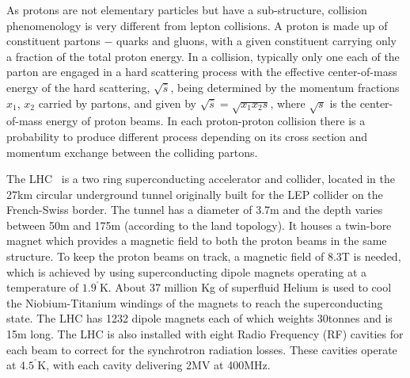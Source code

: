 As protons are not elementary particles but have a sub-structure, \pp collision phenomenology is very different from lepton collisions. A proton 
is made up of constituent partons $-$ quarks and gluons, with a given constituent carrying only a fraction of the total proton energy. In a collision, 
typically only one each of the parton are engaged in a hard scattering process with the effective center-of-mass energy of the hard scattering, 
$\sqrt{\hat{s}}$, being determined by the momentum fractions $x_{1}$, $x_{2}$ carried by partons, and given by $\sqrt{\hat{s}}=\sqrt{x_{1}x_{2}s}$, 
where $\sqrt{s}$ is the center-of-mass energy of proton beams. In each proton-proton collision there is a probability to produce different process 
depending on its cross section and momentum exchange between the colliding partons.

The LHC~\cite{Evans:2008zzb,Brüning:782076} is a two ring superconducting accelerator and collider, located in the 27\unit{km} circular underground 
tunnel originally built for the LEP collider on the French-Swiss border. The tunnel has a diameter of 3.7\unit{m} and the depth varies between 
50\unit{m} and 175\unit{m} (according to the land topology). It houses a twin-bore magnet which provides a magnetic field to both the proton beams in 
the same structure. To keep the proton beams on track, a magnetic field of 8.3\unit{T} is needed, which is achieved by using superconducting dipole 
magnets operating at a temperature of $1.9^{^{\circ}}$\unit{K}. About 37 million Kg of superfluid Helium is used to cool the Niobium-Titanium windings 
of the magnets to reach the superconducting state. The LHC has 1232 dipole magnets each of which weights 30\unit{tonnes} and is 15\unit{m} long. The 
LHC is also installed with eight Radio Frequency (RF) cavities for each beam to correct for the synchrotron radiation losses. These cavities operate at 
$4.5^{^{\circ}}$\unit{K}, with each cavity delivering  2\unit{MV} at 400\unit{MHz}.

